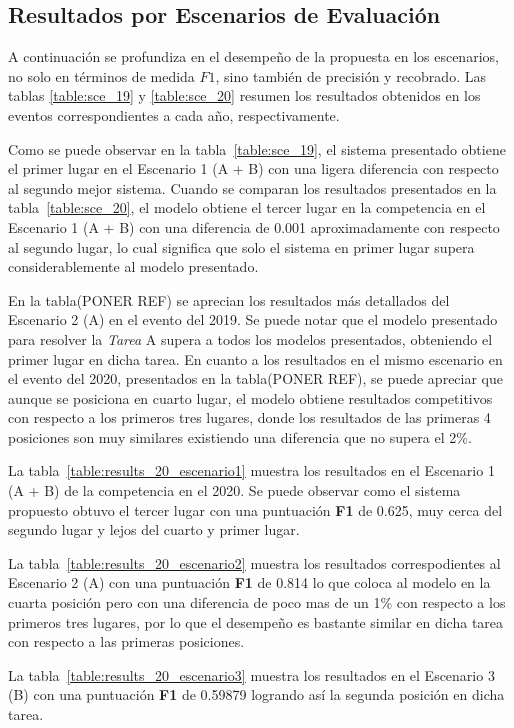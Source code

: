 \subsection{Resultados por Escenarios de Evaluación}

A continuación se profundiza en el desempeño de la propuesta en los escenarios, no solo en términos de medida $F1$, sino también de precisión y recobrado.
Las tablas \ref{table:sce_19} y \ref{table:sce_20} resumen los resultados obtenidos en los eventos correspondientes a cada año, respectivamente.

Como se puede observar en la tabla~\ref{table:sce_19}, el sistema presentado obtiene el primer lugar en el Escenario 1 (A + B) con una ligera diferencia con respecto al segundo mejor sistema. Cuando se comparan los resultados presentados en la tabla~\ref{table:sce_20}, el modelo obtiene el tercer lugar en la competencia en el Escenario 1 (A + B) con una diferencia de 0.001 aproximadamente con respecto al segundo lugar, lo cual significa que solo el sistema en primer lugar supera considerablemente al modelo presentado.

En la tabla(PONER REF) se aprecian los resultados m\'as detallados del Escenario 2 (A) en el evento del 2019. Se puede notar que el modelo presentado para resolver la \emph{Tarea} A supera a todos los modelos presentados, obteniendo el primer lugar en dicha tarea. En cuanto a los resultados en el mismo escenario en el evento del 2020, presentados en la tabla(PONER REF), se puede apreciar que aunque se posiciona en cuarto lugar, el modelo obtiene resultados competitivos con respecto a los primeros tres lugares, donde los resultados de las primeras 4 posiciones son muy similares existiendo una diferencia que no supera el 2\%.

La tabla~\ref{table:results_20_escenario1} muestra los resultados en el Escenario 1 (A + B) de la competencia en el 2020. Se puede observar como el sistema propuesto obtuvo el tercer lugar con una puntuaci\'on \textbf{F1} de 0.625, muy cerca del segundo lugar y lejos del cuarto y primer lugar. 

La tabla~\ref{table:results_20_escenario2} muestra los resultados correspodientes al Escenario 2 (A) con una puntuaci\'on \textbf{F1} de 0.814 lo que coloca al modelo en la cuarta posici\'on pero con una diferencia de poco mas de un 1\% con respecto a los primeros tres lugares, por lo que el desempe\~no es bastante similar en dicha tarea con respecto a las primeras posiciones.

La tabla~\ref{table:results_20_escenario3} muestra los resultados en el Escenario 3 (B) con una puntuaci\'on \textbf{F1} de 0.59879 logrando as\'i la segunda posici\'on en dicha tarea.

